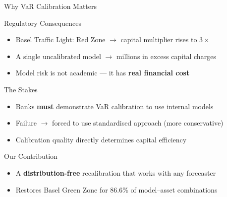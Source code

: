 \documentclass[9pt, aspectratio=169, t]{beamer}
\begin{document}
\begin{frame}{Why VaR Calibration Matters}
	\vspace{-0.2cm}
	{\small
	\begin{alertblock}{Regulatory Consequences}
		\begin{itemize}\setlength{\itemsep}{2pt}
			\item Basel Traffic Light: Red Zone $\to$ capital multiplier rises to $3\times$
			\item A single uncalibrated model $\to$ millions in excess capital charges
			\item Model risk is not academic --- it has \textbf{real financial cost}
		\end{itemize}
	\end{alertblock}
	\begin{block}{The Stakes}
		\begin{itemize}\setlength{\itemsep}{2pt}
			\item Banks \textbf{must} demonstrate VaR calibration to use internal models
			\item Failure $\to$ forced to use standardised approach (more conservative)
			\item Calibration quality directly determines capital efficiency
		\end{itemize}
	\end{block}
	\begin{block}{Our Contribution}
		\begin{itemize}\setlength{\itemsep}{2pt}
			\item A \textbf{distribution-free} recalibration that works with any forecaster
			\item Restores Basel Green Zone for 86.6\% of model--asset combinations
		\end{itemize}
	\end{block}
	}
\end{frame}
\end{document}

